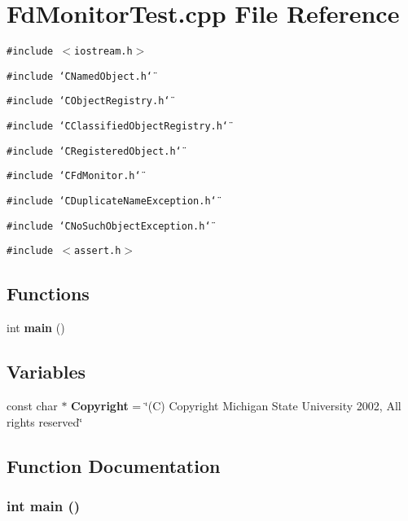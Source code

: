 \section{Fd\-Monitor\-Test.cpp File Reference}
\label{FdMonitorTest_8cpp}
{\tt \#include $<$iostream.h$>$}\par
{\tt \#include \char`\"{}CNamed\-Object.h\char`\"{}}\par
{\tt \#include \char`\"{}CObject\-Registry.h\char`\"{}}\par
{\tt \#include \char`\"{}CClassified\-Object\-Registry.h\char`\"{}}\par
{\tt \#include \char`\"{}CRegistered\-Object.h\char`\"{}}\par
{\tt \#include \char`\"{}CFd\-Monitor.h\char`\"{}}\par
{\tt \#include \char`\"{}CDuplicate\-Name\-Exception.h\char`\"{}}\par
{\tt \#include \char`\"{}CNo\-Such\-Object\-Exception.h\char`\"{}}\par
{\tt \#include $<$assert.h$>$}\par
\subsection*{Functions}
\begin{CompactItemize}
\item 
int {\bf main} ()
\end{CompactItemize}
\subsection*{Variables}
\begin{CompactItemize}
\item 
const char $\ast$ {\bf Copyright} = \char`\"{}(C) Copyright Michigan State University 2002, All rights reserved\char`\"{}
\end{CompactItemize}


\subsection{Function Documentation}
\subsubsection{\setlength{\rightskip}{0pt plus 5cm}int main ()}\label{FdMonitorTest_8cpp_a1}




